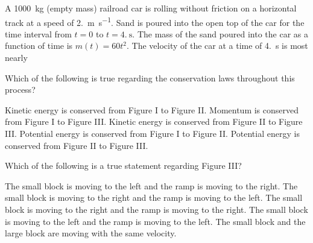 \documentclass{../../oss-apphys-exam}
\begin{document}
\begin{multicols*}{2}
\begin{questions}
    \question A \SI{1000}{\kilo\gram} (empty mass) railroad car is rolling
    without friction on a horizontal track at a speed of
    \SI{2.}{\metre\per\second}. Sand is poured into the open top of the car for
    the time interval from $t=0$ to $t=\SI{4.}{\second}$. The mass of the sand
    poured into the car as a function of time is $m(t)=60t^2$. The velocity of
    the car at a time of \SI{4.}{\second} is most nearly
    \columnbreak
    

    \question Which of the following is true regarding the conservation laws
    throughout this process?
    \label{ramps1}
    \begin{choices}
      \choice Kinetic energy is conserved from Figure I to Figure II.
      \choice Momentum is conserved from Figure I to Figure III.
      \choice Kinetic energy is conserved from Figure II to Figure III.
      \choice Potential energy is conserved from Figure I to Figure II.
      \choice Potential energy is conserved from Figure II to Figure III.
    \end{choices}
    
    \question Which of the following is a true statement regarding Figure III?
    \label{ramps2}
    \begin{choices}
      \choice The small block is moving to the left and the ramp is moving to
      the right.
      \choice The small block is moving to the right and the ramp is moving
      to the left.
      \choice The small block is moving to the right and the ramp is moving
      to the right.
      \choice The small block is moving to the left and the ramp is moving to
      the left.
      \choice The small block and the large block are moving with the same
      velocity.
    \end{choices}
    

\end{questions}
\end{multicols*}
\end{document}
